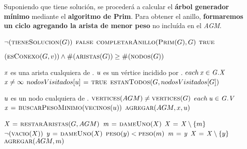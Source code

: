 Suponiendo que tiene solución, se procederá a calcular el \textbf{árbol
generador mínimo} mediante el \textbf{algoritmo de Prim}. Para obtener el
anillo, \textbf{formaremos un ciclo agregando la arista de menor peso} no
incluída en el \textit{AGM}.


\begin{codebox}
\li \If $\neg (\textnormal{\scshape tieneSolucion}(G))$
\li     \Then
            \Return $\textnormal{\scshape false}$
        \End
\li $\textnormal{\scshape completarAnillo}(\textnormal{\scshape Prim}(G),G)$
\li \Return $\textnormal{\scshape true}$
\end{codebox}


\vspace*{0.3cm}


\begin{codebox}
\li \Return $(\textnormal{\scshape esConexo}(G,v)) \land
    \textnormal{\scshape\#}(\textnormal{\scshape aristas}(G)) \geq
    \textnormal{\scshape\#}(\textnormal{\scshape nodos}(G))$
\end{codebox}


\vspace*{0.3cm}


\begin{codebox}
\li \Comment $\id{x}$ es una arista cualquiera de .
\li \Comment $\id{u}$ es un vértice incidido por .
\li \For $each \hspace{0.07cm} \id{x} \in \id{G.X}$
\li     \Do
            \If $\id{x} \neq \infty$
\li             \Then
                    $nodosVisitados[u] \mathrel{\hspace{1pt}=\hspace{1pt}} \textnormal{\scshape true}$
                \End
        \End
\li \Return $\textnormal{\scshape estanTodos}(G,nodosVisitados[G])$
\end{codebox}


\vspace*{0.3cm}


\begin{codebox}
\li \Comment $\id{u}$ es un nodo cualquiera de .
\li \While $\textnormal{\scshape vertices}(AGM) \neq \textnormal{\scshape vertices}(G)$
\li     \Do
            \For $each \hspace{0.07cm} \id{u} \in \id{G.V}$
\li             \Do
                    $\id{x} \gets \proc{buscarPesoMinimo}(\proc{vecinos}(u))$
\li                 $\textnormal{\scshape agregar}(AGM,x,u)$
                \End
        \End
\end{codebox}


\vspace*{0.3cm}


\begin{codebox}
\li $\id{X} \gets \proc{restarAristas}(G,AGM)$
\li $\id{m} \gets \proc{dameUno}(X)$
\li $\id{X} \gets \id{X} \setminus \{m\}$
\li \While $\neg (\textnormal{\scshape vacio}(X))$
\li     \Do
            $\id{y} \gets \proc{dameUno}(X)$
\li         \If $\textnormal{\scshape peso}(y) < \textnormal{\scshape peso}(m)$
\li             \Then
                    $\id{m} \gets \id{y}$
                \End
\li         $\id{X} \gets \id{X} \setminus \{y\}$
        \End
\li \Return $\textnormal{\scshape agregar}(AGM, m)$
\end{codebox}



